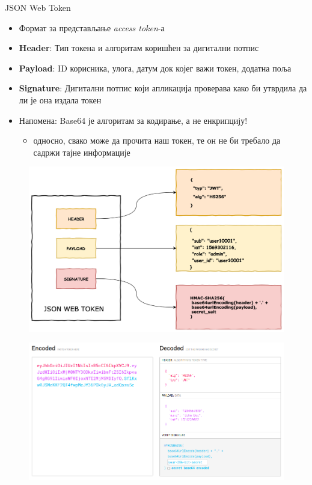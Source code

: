 \documentclass[aspectratio=169]{beamer}
\begin{document}
    \begin{frame}[allowframebreaks]{JSON Web Token}
        \begin{itemize}
            \item Формат за представљање \textit{access token}-а
            \item \textbf{Header}: Тип токена и алгоритам коришћен за дигитални потпис
            \item \textbf{Payload}: ID корисника, улога, датум док којег важи токен, додатна поља
            \item \textbf{Signature}: Дигитални потпис који апликација проверава како би утврдила да ли је она издала токен
            \item Напомена: Base64 је алгоритам за кодирање, а не енкрипцију!
            \begin{itemize}
                \item односно, свако може да прочита наш токен, те он не би требало да садржи тајне информације
            \end{itemize}
        \end{itemize}
        
        \framebreak
        
        \begin{figure}
            \centering
            \includegraphics[width=\textwidth,height=0.8\textheight,keepaspectratio]{images/jwt.png}
            \label{fig:jwt}
        \end{figure}
        
        \framebreak
        
        \begin{figure}
            \centering
            \includegraphics[width=\textwidth,height=0.8\textheight,keepaspectratio]{images/jwt_enc.png}
            \label{fig:jwt_enc}
        \end{figure}
    \end{frame}
    
\end{document}
